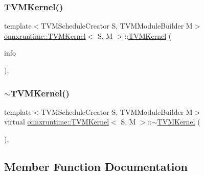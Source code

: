 \subsubsection{\texorpdfstring{T\+V\+M\+Kernel()}{TVMKernel()}}
{\footnotesize\ttfamily template$<$T\+V\+M\+Schedule\+Creator S, T\+V\+M\+Module\+Builder M$>$ \\
\mbox{\hyperlink{classonnxruntime_1_1TVMKernel}{onnxruntime\+::\+T\+V\+M\+Kernel}}$<$ S, M $>$\+::\mbox{\hyperlink{classonnxruntime_1_1TVMKernel}{T\+V\+M\+Kernel}} (\begin{DoxyParamCaption}\item[{const \mbox{\hyperlink{classonnxruntime_1_1OpKernelInfo}{Op\+Kernel\+Info}} \&}]{info }\end{DoxyParamCaption})\hspace{0.3cm}{\ttfamily [inline]}, {\ttfamily [explicit]}}

\mbox{\label{classonnxruntime_1_1TVMKernel_a5cc8f5923e72ad8d758d4471f1864591}} 
\subsubsection{\texorpdfstring{$\sim$\+T\+V\+M\+Kernel()}{~TVMKernel()}}
{\footnotesize\ttfamily template$<$T\+V\+M\+Schedule\+Creator S, T\+V\+M\+Module\+Builder M$>$ \\
virtual \mbox{\hyperlink{classonnxruntime_1_1TVMKernel}{onnxruntime\+::\+T\+V\+M\+Kernel}}$<$ S, M $>$\+::$\sim$\mbox{\hyperlink{classonnxruntime_1_1TVMKernel}{T\+V\+M\+Kernel}} (\begin{DoxyParamCaption}{ }\end{DoxyParamCaption})\hspace{0.3cm}{\ttfamily [inline]}, {\ttfamily [virtual]}}



\subsection{Member Function Documentation}
\mbox{\label{classonnxruntime_1_1TVMKernel_a9cb269c12f0d89742397c71aa1362573}} 

